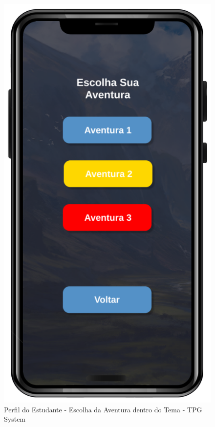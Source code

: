 \begin{figure}[!h]
\centering
\caption{Perfil do Estudante - Escolha da Aventura dentro do Tema - TPG System}%
\label{fig:Tela12}
\includegraphics[scale=0.20]{Illustrations/Tela12.png}
\end{figure}

